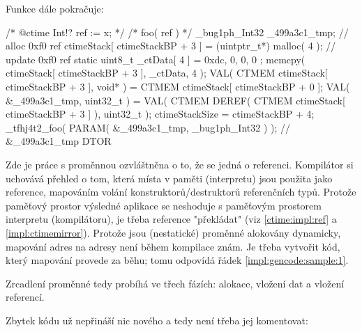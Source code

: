 Funkce  dále pokračuje:

\begin{cppcode}
		/* @ctime Int!? ref := x; */
		/* foo( ref ) */
		{
			_bug1ph_Int32 _499a3c1_tmp;
			// alloc 0xf0 ref
			ctimeStack[ ctimeStackBP + 3 ] = (uintptr_t*) malloc( 4 );
			{
				// update 0xf0 ref
				static uint8_t _ctData[ 4 ] = { 0xdc, 0, 0, 0 };
				memcpy( ctimeStack[ ctimeStackBP + 3 ], _ctData, 4 );
				VAL( CTMEM ctimeStack[ ctimeStackBP + 3 ], void* ) = CTMEM ctimeStack[ ctimeStackBP + 0 ];$\label{impl:gencode:sample:1}$
			}
			VAL( &_499a3c1_tmp, uint32_t ) = VAL( CTMEM DEREF( CTMEM ctimeStack[ ctimeStackBP + 3 ] ), uint32_t );
			ctimeStackSize = ctimeStackBP + 4;
			_tfhj4t2_foo( PARAM( &_499a3c1_tmp, _bug1ph_Int32 ) );
			// &_499a3c1_tmp DTOR
		}
\end{cppcode}

Zde je práce s \ctime proměnnou ozvláštněna o to, že se jedná o referenci. Kompilátor si uchovává přehled o tom, která místa v paměti (interpretu) jsou použita jako reference, mapováním volání konstruktorů/destruktorů referenčních typů. Protože paměťový prostor výsledné aplikace se neshoduje s paměťovým prostorem interpretu (kompilátoru), je třeba reference "překládat" (viz \autoref{ctime:impl:ref} a \autoref{impl:ctimemirror}). Protože jsou (nestatické) \ctime proměnné alokovány dynamicky, mapování \ctime adres na \nonctime adresy není během kompilace znám. Je třeba vytvořit kód, který mapování provede za běhu; tomu odpovídá řádek \ref{impl:gencode:sample:1}.

Zrcadlení \ctime proměnné tedy probíhá ve třech fázích: alokace, vložení dat a vložení referencí.

Zbytek kódu už nepřináší nic nového a tedy není třeba jej komentovat:

